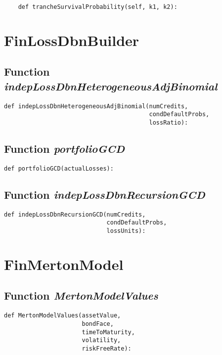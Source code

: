 \documentclass[twoside,11pt]{book}
\begin{document}
\begin{lstlisting}
    def trancheSurvivalProbability(self, k1, k2):
\end{lstlisting}

\newpage
\section{FinLossDbnBuilder}

\subsection{Function {\it indepLossDbnHeterogeneousAdjBinomial}}


\begin{lstlisting}
def indepLossDbnHeterogeneousAdjBinomial(numCredits,
                                         condDefaultProbs,
                                         lossRatio):
\end{lstlisting}

\subsection{Function {\it portfolioGCD}}


\begin{lstlisting}
def portfolioGCD(actualLosses):
\end{lstlisting}

\subsection{Function {\it indepLossDbnRecursionGCD}}


\begin{lstlisting}
def indepLossDbnRecursionGCD(numCredits, 
                             condDefaultProbs,
                             lossUnits):
\end{lstlisting}

\newpage
\section{FinMertonModel}

\subsection{Function {\it MertonModelValues}}


\begin{lstlisting}
def MertonModelValues(assetValue, 
                      bondFace, 
                      timeToMaturity, 
                      volatility, 
                      riskFreeRate):
\end{lstlisting}
\end{document}
